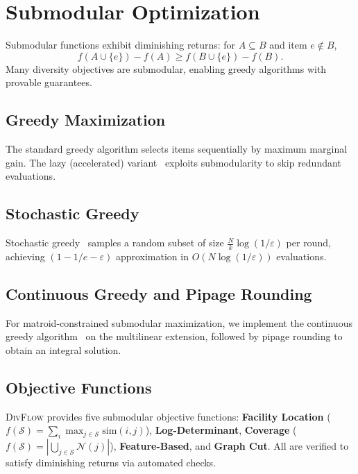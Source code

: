 \documentclass[11pt]{article}
\begin{document}
\section{Submodular Optimization}
\label{sec:submodular}

Submodular functions exhibit diminishing returns: for $A \subseteq B$ and item
$e \notin B$,
\begin{equation}
f(A \cup \{e\}) - f(A) \geq f(B \cup \{e\}) - f(B).
\end{equation}
Many diversity objectives are submodular, enabling greedy algorithms with
provable guarantees.

\subsection{Greedy Maximization}

The standard greedy algorithm selects items sequentially by maximum marginal
gain. The lazy (accelerated) variant~\citep{minoux1978accelerated} exploits
submodularity to skip redundant evaluations.

\subsection{Stochastic Greedy}

Stochastic greedy~\citep{mirzasoleiman2015lazier} samples a random subset of
size $\frac{N}{k} \log(1/\varepsilon)$ per round, achieving
$(1-1/e-\varepsilon)$ approximation in $O(N \log(1/\varepsilon))$ evaluations.

\subsection{Continuous Greedy and Pipage Rounding}

For matroid-constrained submodular maximization, we implement the continuous
greedy algorithm~\citep{calinescu2011maximizing} on the multilinear extension,
followed by pipage rounding to obtain an integral solution.

\subsection{Objective Functions}

\textsc{DivFlow} provides five submodular objective functions:
\textbf{Facility Location} ($f(\mathcal{S}) = \sum_i \max_{j \in \mathcal{S}} \text{sim}(i,j)$),
\textbf{Log-Determinant},
\textbf{Coverage} ($f(\mathcal{S}) = |\bigcup_{j \in \mathcal{S}} \mathcal{N}(j)|$),
\textbf{Feature-Based},
and \textbf{Graph Cut}.
All are verified to satisfy diminishing returns via automated checks.
\end{document}
